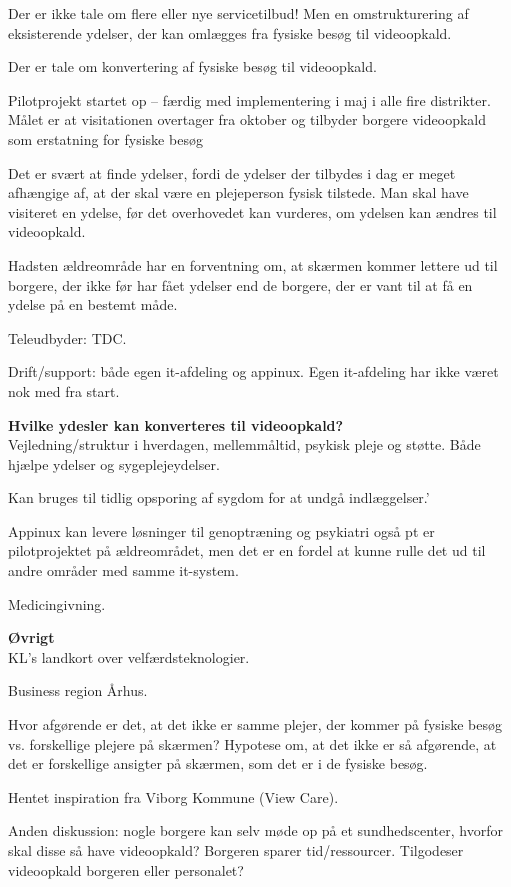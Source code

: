 Der er ikke tale om flere eller nye servicetilbud! Men en omstrukturering af eksisterende ydelser, der kan omlægges fra fysiske besøg til videoopkald. 

Der er tale om konvertering af fysiske besøg til videoopkald.

Pilotprojekt startet op – færdig med implementering i maj i alle fire distrikter. Målet er at visitationen overtager fra oktober og tilbyder borgere videoopkald som erstatning for fysiske besøg

Det er svært at finde ydelser, fordi de ydelser der tilbydes i dag er meget afhængige af, at der skal være en plejeperson fysisk tilstede. Man skal have visiteret en ydelse, før det overhovedet kan vurderes, om ydelsen kan ændres til videoopkald. 

Hadsten ældreområde har en forventning om, at skærmen kommer lettere ud til borgere, der ikke før har fået ydelser  end de borgere, der er vant til at få en ydelse på en bestemt måde.  

Teleudbyder: TDC. 

Drift/support: både egen it-afdeling og appinux. Egen it-afdeling har ikke været nok med fra start.


\textbf{Hvilke ydesler kan konverteres til videoopkald?}
\\
Vejledning/struktur i hverdagen, mellemmåltid, psykisk pleje og støtte. Både hjælpe ydelser og sygeplejeydelser. 

Kan bruges til tidlig opsporing af sygdom for at undgå indlæggelser.'

Appinux kan levere løsninger til genoptræning og psykiatri også  pt er pilotprojektet på ældreområdet, men det er en fordel at kunne rulle det ud til andre områder med samme it-system.

Medicingivning.

\textbf{Øvrigt}
\\
KL’s landkort over velfærdsteknologier.

Business region Århus. 

Hvor afgørende er det, at det ikke er samme plejer, der kommer på fysiske besøg vs. forskellige plejere på skærmen? Hypotese om, at det ikke er så afgørende, at det er forskellige ansigter på skærmen, som det er i de fysiske besøg. 

Hentet inspiration fra Viborg Kommune (View Care).

Anden diskussion: nogle borgere kan selv møde op på et sundhedscenter, hvorfor skal disse så have videoopkald? Borgeren sparer tid/ressourcer. Tilgodeser videoopkald borgeren eller personalet? 

